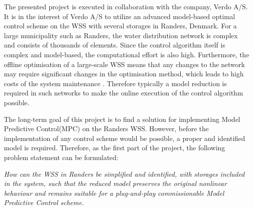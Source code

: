The presented project is executed in collaboration with the company, Verdo A/S. It is in the interest of Verdo A/S to utilize an advanced model-based optimal control scheme on the WSS with several storages in Randers, Denmark. For a large municipality such as Randers, the water distribution network is complex and consists of thousands of elements. Since the control algorithm itself is complex and model-based, the computational effort is also high. Furthermore, the offline optimisation of a large-scale WSS means that any changes to the network may require significant changes in the optimisation method, which leads to high costs of the system maintenance \cite{brdys1994operational}. Therefore typically a model reduction is required in such networks to make the online execution of the control algorithm possible. 

The long-term goal of this project is to find a solution for implementing Model Predictive Control(MPC) on the Randers WSS. However, before the implementation of any control scheme would be possible, a proper and identified model is required. Therefore, as the first part of the project, the following problem statement can be formulated: 

\newpage

\emph{How can the WSS in Randers be simplified and identified, with storages included in the system, such that the reduced model preserves the original nonlinear behaviour and remains suitable for a plug-and-play commissionable Model Predictive Control scheme.}









